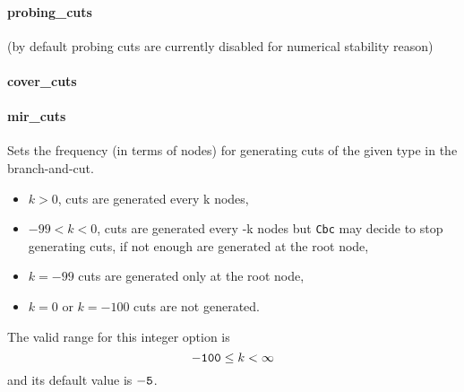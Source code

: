 \paragraph{probing\_cuts}(by default probing cuts are currently disabled for numerical stability reason)
\paragraph{cover\_cuts}
\label{cover_cuts}
\paragraph{mir\_cuts}
\label{mir_cuts}
Sets the frequency (in terms of nodes) for generating cuts of
the given type in the branch-and-cut.
\begin{itemize}
\item $k > 0$, cuts are generated every k nodes,
\item $-99 < k < 0$,  cuts are generated every -k nodes but
{\tt Cbc} may decide to stop generating cuts, if not
enough are generated at the root node,
\item$k = -99$ cuts are generated only at the root node,
\item $k = 0$ or $k = -100$ cuts are not generated.
\end{itemize}
 The valid range for this integer option is
$${\tt -100} \le k <  \infty$$
and its default value is ${\tt -5}$.
